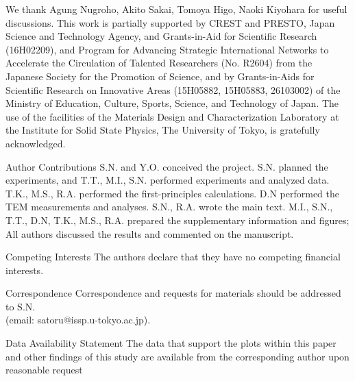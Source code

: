 \documentclass[amsmath,amssymb]{nature}
\begin{document}




\begin{addendum}

 \item We thank Agung Nugroho, Akito Sakai, Tomoya Higo, Naoki Kiyohara for useful discussions. 
This work is partially supported by CREST and PRESTO, Japan Science and Technology Agency, and Grants-in-Aid for Scientific Research (16H02209), and Program for Advancing Strategic International Networks to Accelerate the Circulation of Talented Researchers (No. R2604) from
the Japanese Society for the Promotion of Science, and by Grants-in-Aids
for Scientific Research on Innovative Areas (15H05882, 15H05883, 26103002)
of the Ministry of Education, Culture, Sports, Science, and Technology of Japan.  The use of the facilities
of the Materials Design and Characterization Laboratory at the Institute for Solid State Physics, The University of Tokyo, is gratefully acknowledged.

 \item[Author Contributions] 
S.N. and Y.O. conceived the project. S.N. planned the experiments, and T.T., M.I., S.N. performed experiments and analyzed data. T.K., M.S., R.A. performed the first-principles calculations. D.N performed the TEM measurements and analyses. S.N., R.A. wrote the main text.  M.I., S.N., T.T., D.N, T.K., M.S., R.A. prepared the supplementary information and figures; All authors discussed the results and commented on the manuscript.

 \item[Competing Interests] The authors declare that they have no competing financial interests.

 \item[Correspondence] Correspondence and requests for materials should be addressed to S.N. \\(email: satoru@issp.u-tokyo.ac.jp).
 
 \item[Data Availability Statement]
The data that support the plots within this paper and other findings of this study are available from the corresponding author upon reasonable request
\end{addendum}
\end{document}
